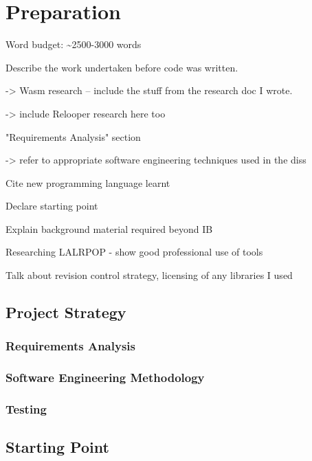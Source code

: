 \documentclass[00-main.tex]{subfiles}
\begin{document}
\chapter{Preparation}

\begin{Comment}
Word budget: \textasciitilde 2500-3000 words
\end{Comment}

\begin{Comment}
Describe the work undertaken before code was written.

-> Wasm research -- include the stuff from the research doc I wrote.

-> include Relooper research here too

"Requirements Analysis" section

-> refer to appropriate software engineering techniques used in the diss

Cite new programming language learnt

Declare starting point

Explain background material required beyond IB

Researching LALRPOP - show good professional use of tools

Talk about revision control strategy, licensing of any libraries I used
\end{Comment}

\section{Project Strategy}

\subsection{Requirements Analysis}

\subsection{Software Engineering Methodology}

\subsection{Testing}

\section{Starting Point}
\end{document}
